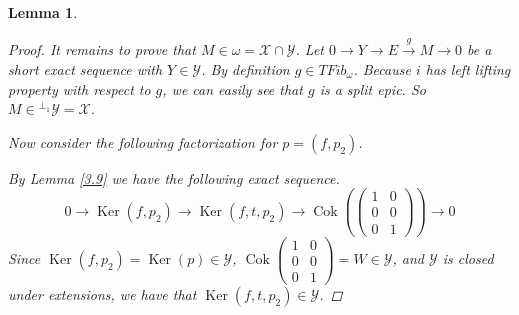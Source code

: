 \documentclass[12pt]{amsart}
\numberwithin{equation}{section}
\newtheorem{lemma}{Lemma}[section]
\theoremstyle{definition}
\DeclareMathOperator{\Ker}{Ker}
\DeclareMathOperator{\Cok}{Cok}
\newtheorem*{theorem 0*}{Theorem}
\newtheorem*{theorem a*}{Theorem A}
\newtheorem*{theorem b*}{Theorem B}
\numberwithin{diagram}{section}
\begin{document}
\begin{lemma}
\begin{proof}
It remains to prove that $M\in \omega=\mathcal{X}\cap\mathcal{Y}$.
Let $0\rightarrow Y\rightarrow E\overset{g}{\rightarrow} M\rightarrow 0$ be a short exact sequence with $Y\in\mathcal{Y}$. By definition $g\in TFib_{\omega}$. Because $i$ has left lifting property with respect to $g$, we can easily see that $g$ is a split epic. So $M\in{}^{\perp_1}\mathcal{Y}=\mathcal{X}$.

Now consider the following factorization for $p=(f,p_2)$.

\begin{center} 
 \end{center}

By Lemma \ref{3.9} we have the following exact sequence.
\[0\rightarrow\Ker(f,p_2)\rightarrow \Ker(f,t,p_2)\rightarrow \Cok(\begin{pmatrix}
1&0\\0&0\\0&1
\end{pmatrix})\rightarrow 0\]
Since $\Ker(f,p_2)=\Ker(p)\in\mathcal{Y}$, $\Cok\begin{pmatrix}
1&0\\0&0\\0&1
\end{pmatrix}=W\in\mathcal{Y}$, and $\mathcal{Y}$ is closed under extensions, we have that $\Ker(f,t,p_2)\in\mathcal{Y}$.


\end{proof}
\end{lemma}
\end{document}
